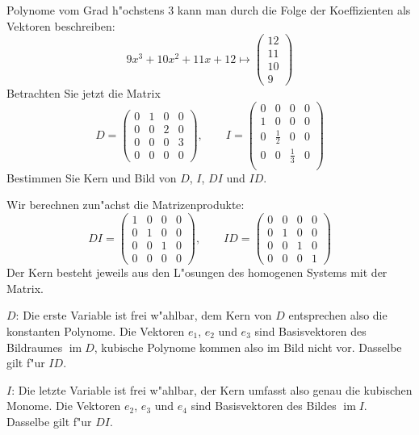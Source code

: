 Polynome vom Grad h"ochstens 3 kann man durch die Folge der
Koeffizienten als Vektoren beschreiben:
\[
9x^3+10x^2+11x+12\mapsto 
\begin{pmatrix}
12\\11\\10\\9
\end{pmatrix}
\]
Betrachten Sie jetzt die Matrix
\[
D=\begin{pmatrix}
0&1&0&0\\
0&0&2&0\\
0&0&0&3\\
0&0&0&0
\end{pmatrix},
\qquad
I=\begin{pmatrix}
0&0&0&0\\
1&0&0&0\\
0&\frac12&0&0\\
0&0&\frac13&0\\
\end{pmatrix}
\]
Bestimmen Sie Kern und Bild von $D$, $I$, $DI$ und $ID$.

\begin{loesung}
Wir berechnen zun"achst die Matrizenprodukte:
\[
DI=\begin{pmatrix}
1&0&0&0\\
0&1&0&0\\
0&0&1&0\\
0&0&0&0
\end{pmatrix},\qquad
ID=\begin{pmatrix}
0&0&0&0\\
0&1&0&0\\
0&0&1&0\\
0&0&0&1
\end{pmatrix}
\]
Der Kern besteht jeweils aus den L"osungen des homogenen Systems mit der
Matrix.

$D$: Die erste Variable ist frei w"ahlbar, dem Kern von $D$ entsprechen also
die konstanten Polynome. Die Vektoren $e_1$, $e_2$ und $e_3$ sind Basisvektoren
des Bildraumes $\operatorname{im}D$, kubische Polynome kommen also im Bild
nicht vor. Dasselbe gilt f"ur $ID$.

$I$: Die letzte Variable ist frei w"ahlbar, der Kern umfasst also
genau die kubischen Monome. Die Vektoren $e_2$, $e_3$ und $e_4$
sind Basisvektoren des Bildes $\operatorname{im}I$. Dasselbe gilt
f"ur $DI$.
\end{loesung}


